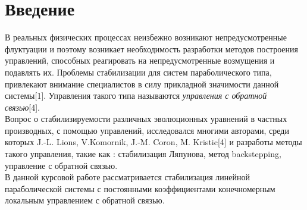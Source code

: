 \section{Введение}
\vspace{1em}

В реальных физических процессах неизбежно возникают непредусмотренные флуктуации и поэтому возникает необходимость разработки методов построения управлений, способных реагировать на непредусмотренные возмущения и подавлять их. Проблемы стабилизации для систем параболического типа, привлекают внимание специалистов в силу прикладной значимости данной системы[1]. Управления такого типа называются \emph{управления с обратной связью}[4].\\

Вопрос о стабилизируемости различных эволюционных уравнений в частных производных, с помощью управлений, исследовался многими авторами, среди которых J.-L. Lions, V.Komornik, J.-M. Coron, M. Kristic[4] и разработы методы такого управления, такие как : стабилизация Ляпунова, метод backstepping, управление с обратной связью.\\

В данной курсовой работе рассматривается стабилизация линейной параболической системы с постоянными коэффициентами конечномерным локальным управлением с обратной связью.